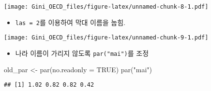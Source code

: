 \documentclass[
]{article}
\newenvironment{Shaded}{\begin{snugshade}}{\end{snugshade}}
\newcommand{\AttributeTok}[1]{\textcolor[rgb]{0.77,0.63,0.00}{#1}}
\newcommand{\ConstantTok}[1]{\textcolor[rgb]{0.00,0.00,0.00}{#1}}
\newcommand{\DecValTok}[1]{\textcolor[rgb]{0.00,0.00,0.81}{#1}}
\newcommand{\FunctionTok}[1]{\textcolor[rgb]{0.00,0.00,0.00}{#1}}
\newcommand{\NormalTok}[1]{#1}
\newcommand{\OtherTok}[1]{\textcolor[rgb]{0.56,0.35,0.01}{#1}}
\newcommand{\SpecialCharTok}[1]{\textcolor[rgb]{0.00,0.00,0.00}{#1}}
\newcommand{\StringTok}[1]{\textcolor[rgb]{0.31,0.60,0.02}{#1}}
\providecommand{\tightlist}{%
  \setlength{\itemsep}{0pt}\setlength{\parskip}{0pt}}
\begin{document}
\begin{Shaded}
\end{Shaded}

\texttt{[image: Gini\_OECD\_files/figure-latex/unnamed-chunk-8-1.pdf]}

\begin{itemize}
\tightlist
\item
  \texttt{las\ =\ 2}를 이용하여 막대 이름을 눕힘.
\end{itemize}

\begin{Shaded}
\end{Shaded}

\texttt{[image: Gini\_OECD\_files/figure-latex/unnamed-chunk-9-1.pdf]}

\begin{itemize}
\tightlist
\item
  나라 이름이 가리지 않도록 \texttt{par("mai")}를 조정
\end{itemize}

\begin{Shaded}
\begin{Highlighting}[]
\NormalTok{old\_par }\OtherTok{\textless{}{-}} \FunctionTok{par}\NormalTok{(}\AttributeTok{no.readonly =} \ConstantTok{TRUE}\NormalTok{)}
\FunctionTok{par}\NormalTok{(}\StringTok{"mai"}\NormalTok{)}
\end{Highlighting}
\end{Shaded}

\begin{verbatim}
## [1] 1.02 0.82 0.82 0.42
\end{verbatim}
\end{document}
